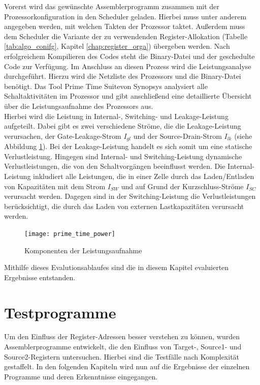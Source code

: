 Vorerst wird das gewünschte Assemblerprogramm zusammen mit der Prozessorkonfiguration in den Scheduler geladen. Hierbei muss unter anderem angegeben werden, mit welchen Takten der Prozessor taktet. Außerdem muss dem Scheduler die Variante der zu verwendenden Register-Allokation (Tabelle \ref{tab:algo_conifg}, Kapitel \ref{chap:register_orga}) übergeben werden. Nach erfolgreichem Kompilieren des Codes steht die Binary-Datei und der geschedulte Code zur Verfügung. Im Anschluss an diesen Prozess wird die Leistungsanalyse durchgeführt. Hierzu wird die Netzliste des Prozessors und die Binary-Datei benötigt. Das Tool \glqq Prime Time Suite\grqq{ }von Synopsys analysiert alle Schaltaktivitäten im Prozessor und gibt anschließend eine detaillierte Übersicht über die Leistungsaufnahme des Prozessors aus.\\
Hierbei wird die Leistung in Internal-, Switching- und Leakage-Leistung aufgeteilt.  Dabei gibt es zwei verschiedene Ströme, die die Leakage-Leistung verursachen, der Gate-Leakage-Strom $I_{gl}$ und der Source-Drain-Strom $I_{lk}$ (siehe Abbildung \ref{fig:prime_time_power}). Bei der Leakage-Leistung handelt es sich somit um eine statische Verlustleistung. Hingegen sind Internal- und Switching-Leistung dynamische Verlustleistungen, die von den Schaltvorgängen beeinflusst werden. Die Internal-Leistung inkludiert alle Leistungen, die in einer Zelle durch das Laden/Entladen von Kapazitäten mit dem Strom $I_{SW}$ und auf Grund der Kurzschluss-Ströme $I_{SC}$ verursacht werden. Dagegen sind in der Switching-Leistung die Verlustleistungen berücksichtigt, die durch das Laden von externen Lastkapazitäten verursacht werden.\cite{primeTime2016}
\begin{figure}[H] 
	\centering
	\texttt{[image: prime\_time\_power]}
	\caption[Komponenten der Leistungsaufnahme]{Komponenten der Leistungsaufnahme \cite{primeTime2016}}
	\label{fig:prime_time_power}
\end{figure}
Mithilfe dieses Evalutionsablaufes sind die in diesem Kapitel evaluierten Ergebnisse entstanden.
\section{Testprogramme}
Um den Einfluss der Register-Adressen besser verstehen zu können, wurden Assemblerprogramme entwickelt, die den Einfluss von Target-, Source1- und Source2-Registern untersuchen. Hierbei sind die Testfälle nach Komplexität gestaffelt. In den folgenden Kapiteln wird nun auf die Ergebnisse der einzelnen Programme und deren Erkenntnisse eingegangen.
